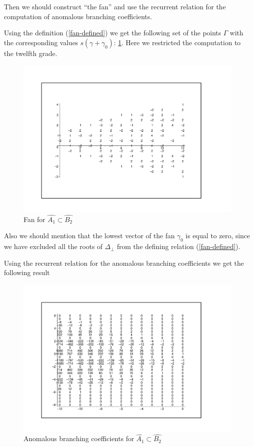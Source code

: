 \documentclass[a4paper,12pt]{article}
\theoremstyle{definition} \newtheorem{Def}{Definition}
\begin{document}
Then we should construct ``the fan'' and use the recurrent relation for the computation of anomalous branching coefficients.

Using the definition (\ref{fan-defined}) we get the following set of
the points $\Gamma$ with the corresponding values $s(\gamma+\gamma_0)$: \ref{fig:AffineB2A1Fan}.
Here we restricted the computation to the twelfth grade.
\begin{figure}[ph]
  \centering
  \includegraphics[width=130mm]{AffineB2_A1_fan.pdf}
  \caption{Fan for $\hat{A_1}\subset \hat{B_2}$}
  \label{fig:AffineB2A1Fan}
\end{figure}

Also we should mention that the lowest vector of the fan $\gamma_0$ is equal to zero, since we have excluded all the roots of $\Delta_{\bot}$ from the defining relation (\ref{fan-defined}).

Using the recurrent relation for the anomalous branching coefficients we get the following result
\begin{figure}[ph]
  \centering
  \includegraphics[width=130mm]{AffineB2_A1_branching.pdf}
  \caption{Anomalous branching coefficients for $\hat{A_1}\subset \hat{B_2}$}
  \label{fig:AffineB2_A1_branching}
\end{figure}
\end{document}
